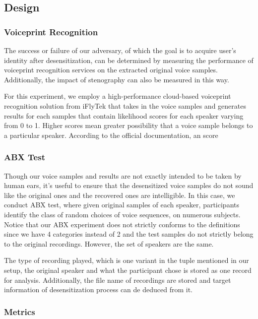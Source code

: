 \documentclass[journal]{IEEEtran} %
\begin{document}
\subsection{Design}

\subsubsection{Voiceprint Recognition}

The success or failure of our adversary, of which the goal is to acquire user's identity after desensitization, can be determined by measuring the performance of voiceprint recognition services on the extracted original voice samples. Additionally, the impact of stenography can also be measured in this way.

For this experiment, we employ a high-performance cloud-based voiceprint recognition solution from iFlyTek that takes in the voice samples and generates results for each samples that contain likelihood scores for each speaker varying from 0 to 1. Higher scores mean greater possibility that a voice sample belongs to a particular speaker. According to the official documentation, an score

\subsubsection{ABX Test}

Though our voice samples and results are not exactly intended to be taken by human ears, it's useful to ensure that the desensitized voice samples do not sound like the original ones and the recovered ones are intelligible. In this case, we conduct ABX test, where given original samples of each speaker, participants identify the class of random choices of voice sequences, on numerous subjects. Notice that our ABX experiment does not strictly conforms to the definitions since we have 4 categories instead of 2 and the test samples do not strictly belong to the original recordings. However, the set of speakers are the same.

The type of recording played, which is one variant in the tuple mentioned in our setup, the original speaker and what the participant chose is stored as one record for analysis. Additionally, the file name of recordings are stored and target information of desensitization process can de deduced from it.

\subsubsection{Metrics}
\end{document}

